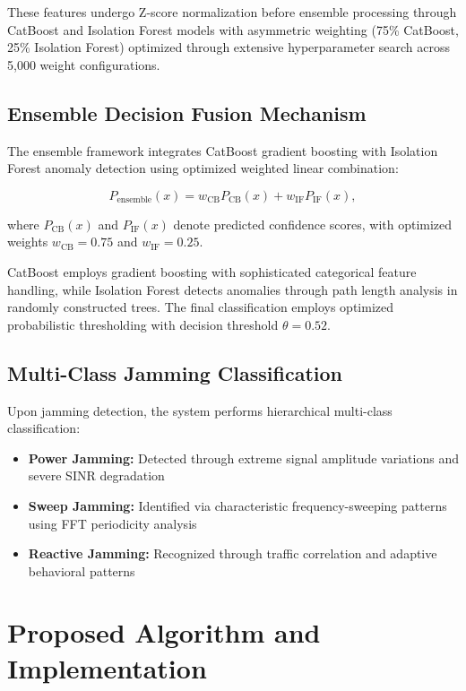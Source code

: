 \documentclass[journal]{IEEEtran}
\begin{document}
These features undergo Z-score normalization before ensemble processing through CatBoost and Isolation Forest models with asymmetric weighting (75\% CatBoost, 25\% Isolation Forest) optimized through extensive hyperparameter search across 5,000 weight configurations.

\subsection{Ensemble Decision Fusion Mechanism}

The ensemble framework integrates CatBoost gradient boosting with Isolation Forest anomaly detection using optimized weighted linear combination:

\begin{equation}
P_{\text{ensemble}}(x) = w_{\text{CB}} P_{\text{CB}}(x) + w_{\text{IF}} P_{\text{IF}}(x),
\label{eq:ensemble_score}
\end{equation}

where $P_{\text{CB}}(x)$ and $P_{\text{IF}}(x)$ denote predicted confidence scores, with optimized weights $w_{\text{CB}} = 0.75$ and $w_{\text{IF}} = 0.25$.

CatBoost employs gradient boosting with sophisticated categorical feature handling, while Isolation Forest detects anomalies through path length analysis in randomly constructed trees. The final classification employs optimized probabilistic thresholding with decision threshold $\theta = 0.52$.

\subsection{Multi-Class Jamming Classification}

Upon jamming detection, the system performs hierarchical multi-class classification:

\begin{itemize}
    \item \textbf{Power Jamming:} Detected through extreme signal amplitude variations and severe SINR degradation
    \item \textbf{Sweep Jamming:} Identified via characteristic frequency-sweeping patterns using FFT periodicity analysis
    \item \textbf{Reactive Jamming:} Recognized through traffic correlation and adaptive behavioral patterns
\end{itemize}

\section{Proposed Algorithm and Implementation}
\end{document}
